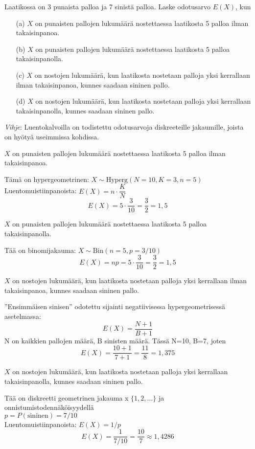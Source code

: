 \documentclass[12pt,a4paper]{article}
\begin{document}
\pagebreak
{}
Laatikossa on 3 punaista palloa ja 7 sinistä palloa. Laske odotusarvo $E(X)$, kun
\begin{enumerate}
    \item[(a)] $X$ on punaisten pallojen lukumäärä nostettaessa laatikosta 5 palloa ilman takaisinpanoa.
    \item[(b)] $X$ on punaisten pallojen lukumäärä nostettaessa laatikosta 5 palloa takaisinpanolla.
    \item[(c)] $X$ on nostojen lukumäärä, kun laatikosta nostetaan palloja yksi kerrallaan ilman takaisinpanoa, kunnes saadaan sininen pallo.
    \item[(d)] $X$ on nostojen lukumäärä, kun laatikosta nostetaan palloja yksi kerrallaan takaisinpanolla, kunnes saadaan sininen pallo.
\end{enumerate}
\emph{Vihje}: Luentokalvoilla on todistettu odotusarvoja diskreeteille jakaumille, joista on hyötyä useimmissa kohdissa.

\begin{kohta}

\item $X$ on punaisten pallojen lukumäärä nostettaessa laatikosta 5 palloa ilman takaisinpanoa.

Tämä on hypergeometrinen: $X\sim \mathrm{Hyperg}(N{=}10,K{=}3,n{=}5)$\\
Luentomuistiinpanoista: $E(X)=n\cdot \dfrac{K}{N}$
\[
E(X)=5\cdot \frac{3}{10}=\frac{3}{2}=1{,}5
\]

\item $X$ on punaisten pallojen lukumäärä nostettaessa laatikosta 5 palloa takaisinpanolla.

Tää on binomijakauma: $X\sim \mathrm{Bin}(n{=}5,p{=}3/10)$
\[
E(X)=np=5\cdot \frac{3}{10}=\frac{3}{2}=1{,}5
\]

\item $X$ on nostojen lukumäärä, kun laatikosta nostetaan palloja yksi kerrallaan ilman takaisinpanoa, kunnes saadaan sininen pallo.

”Ensimmäisen sinisen” odotettu sijainti negatiivisessa hypergeometrisessä asetelmassa:
\[
E(X)=\frac{N+1}{B+1}
\]
N on kaikkien pallojen määrä, B sinisten määrä. Tässä N=10, B=7, joten
\[
E(X)=\frac{10+1}{7+1}=\frac{11}{8}=1{,}375
\]

\item $X$ on nostojen lukumäärä, kun laatikosta nostetaan palloja yksi kerrallaan takaisinpanolla, kunnes saadaan sininen pallo.

Tää on diskreetti geometrinen jakauma x \in $\{1,2,\dots\}$ ja onnistumistodennäköisyydellä\\
$p=P(\text{sininen})=7/10$\\ Luentomuistiinpanoista: $E(X)=1/p$
\[
E(X)=\frac{1}{7/10}=\frac{10}{7}\approx 1{,}4286
\]

\end{kohta}
\end{document}
